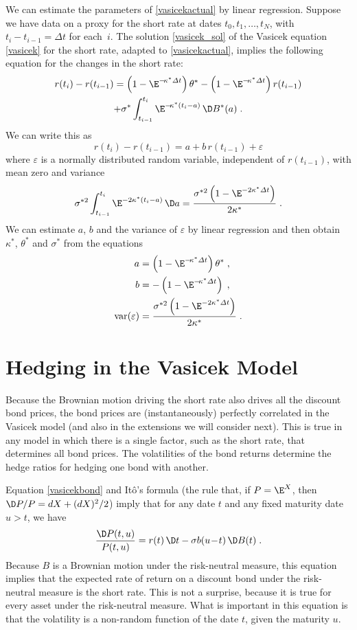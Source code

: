 We can estimate the parameters of  \eqref{vasicekactual} by linear regression. Suppose we have data on a proxy for the short rate at dates $t_0, t_1, \ldots, t_N$, with $t_{i}-t_{i-1}=\varDelta t$ for each~$i$. The solution \eqref{vasicek_sol} of the Vasicek equation \eqref{vasicek} for the short rate, adapted to \eqref{vasicekactual}, implies the following equation for the changes in the short rate:
\begin{multline*}
r(t_i) - r(t_{i-1}) = \left(1- \E^{-\!\kappa^* \varDelta t}\right)\theta^* -\left(1- \E^{-\!\kappa^* \varDelta t}\right)r(t_{i-1}) \\+ \sigma^* 
\int_{t_{i-1}}^{t_i} \E^{-\!\kappa^* (t_i-a)} \,\D B^*(a)\; .
\end{multline*}
We can write this as
$$r(t_i) - r(t_{i-1}) = a + b\,r(t_{i-1}) + \varepsilon$$
where $\varepsilon$ is a normally distributed random variable, independent of $r(t_{i-1})$, with mean zero and variance
$$\sigma^{*2} 
\int_{t_{i-1}}^{t_i} \E^{-2\kappa^* (t_i-a)}\,\D a = \frac{\sigma^{*2}\left(1-\E^{-2\kappa^*\varDelta t}\right)}{2\kappa^*}\; .$$
We can estimate $a$, $b$ and the variance of $\varepsilon$ by linear regression and then obtain $\kappa^*$, $\theta^*$ and $\sigma^*$ from the equations
\begin{align*}
a& = \left(1- \E^{-\!\kappa^* \varDelta t}\right)\theta^*\; ,\\
b&= -\left(1- \E^{-\!\kappa^* \varDelta t}\right)\; ,\\
\text{var}(\varepsilon) &= \frac{\sigma^{*2}\left(1-\E^{-2\kappa^*\varDelta t}\right)}{2\kappa^*}\;.
\end{align*}

\section{Hedging in the Vasicek Model}\label{s_vasicekhedging}


Because the Brownian motion driving the short rate also drives all the discount bond prices, the bond prices are (instantaneously) perfectly correlated in the Vasicek model (and also in the extensions we will consider next).  This is true in any model in which there is a single factor, such as the short rate, that determines all bond prices.  The volatilities of the bond returns determine the hedge ratios for hedging one bond with another.  

Equation \eqref{vasicekbond} and It\^o's formula (the rule that, if $P=\E^X$, then $\D P/P = dX + (dX)^2/2$) imply that for any date $t$ and any fixed maturity date $u>t$, we have
\begin{equation}\label{vasicekbondreturn}
\frac{\D P(t,u)}{P(t,u)} = r(t)\,\D t - \sigma b(u\!-\!t)\,\D B(t)\;.
\end{equation}
Because $B$ is a Brownian motion under the risk-neutral measure, this equation implies that the expected rate of return on a discount bond under the risk-neutral measure is the short rate.  This is not a surprise, because it is true for every asset under the risk-neutral measure.  What is important in this equation is that the volatility is a non-random function of the date $t$, given the maturity $u$.

